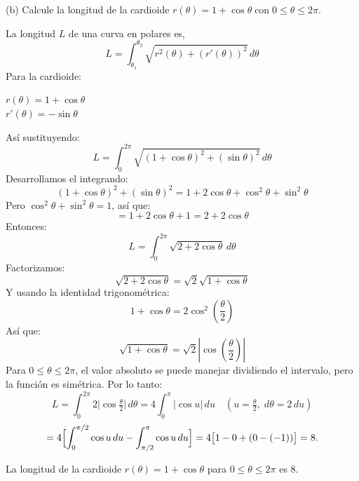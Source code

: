 \documentclass{article}
\theoremstyle{nonumberplain}
\begin{document}
(b) Calcule la longitud de la cardioide \( r(\theta)=1+\cos \theta \operatorname{con} 0 \leq \theta \leq 2 \pi \).

La longitud \( L \) de una curva en polares es,
\[
L = \int_{\theta_1}^{\theta_2} \sqrt{r^2(\theta) + (r'(\theta))^2} \, d\theta
\]
Para la cardioide:

\( r(\theta) = 1 + \cos \theta \)\\
\( r'(\theta) = -\sin \theta \)

Así sustituyendo:
\[
L = \int_{0}^{2\pi} \sqrt{(1+\cos \theta)^2 + (\sin \theta)^2} \, d\theta
\]
Desarrollamos el integrando:
\[
(1+\cos \theta)^2 + (\sin \theta)^2 = 1 + 2\cos \theta + \cos^2 \theta + \sin^2 \theta
\]
Pero \( \cos^2 \theta + \sin^2 \theta = 1 \), así que:
\[
= 1 + 2\cos \theta + 1 = 2 + 2\cos \theta
\]
Entonces:
\[
L = \int_{0}^{2\pi} \sqrt{2 + 2\cos \theta} \, d\theta
\]
Factorizamos:
\[
\sqrt{2 + 2\cos \theta} = \sqrt{2} \sqrt{1 + \cos \theta}
\]
Y usando la identidad trigonométrica:
\[
1 + \cos \theta = 2 \cos^2 \left(\frac{\theta}{2}\right)
\]
Así que:
\[
\sqrt{1 + \cos \theta} = \sqrt{2} \left|\cos \left(\frac{\theta}{2}\right)\right|
\]
Para \( 0 \leq \theta \leq 2\pi \), el valor absoluto se puede manejar dividiendo el intervalo, pero la función es simétrica.
Por lo tanto:
\[
L
=\int_{0}^{2\pi}2\bigl|\cos\!\tfrac\theta2\bigr|\,d\theta
=4\int_{0}^{\pi}\bigl|\cos u\bigr|\,du
\quad(u=\tfrac\theta2,\;d\theta=2\,du)
\]
\[
=4\Bigl[\int_{0}^{\pi/2}\cos u\,du
-\int_{\pi/2}^{\pi}\cos u\,du\Bigr]
=4\bigl[1-0+(0-(-1))\bigr]
=8.
\]


La longitud de la cardioide \( r(\theta) = 1 + \cos \theta \) para \( 0 \leq \theta \leq 2\pi \) es 8.
\end{document}
